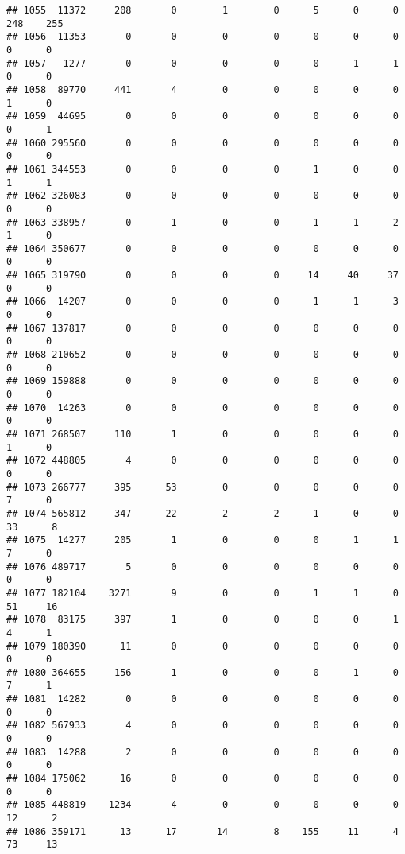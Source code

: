 \documentclass[
]{article}
\begin{document}
\begin{verbatim}
## 1055  11372     208       0        1        0      5      0      0   248    255
## 1056  11353       0       0        0        0      0      0      0     0      0
## 1057   1277       0       0        0        0      0      1      1     0      0
## 1058  89770     441       4        0        0      0      0      0     1      0
## 1059  44695       0       0        0        0      0      0      0     0      1
## 1060 295560       0       0        0        0      0      0      0     0      0
## 1061 344553       0       0        0        0      1      0      0     1      1
## 1062 326083       0       0        0        0      0      0      0     0      0
## 1063 338957       0       1        0        0      1      1      2     1      0
## 1064 350677       0       0        0        0      0      0      0     0      0
## 1065 319790       0       0        0        0     14     40     37     0      0
## 1066  14207       0       0        0        0      1      1      3     0      0
## 1067 137817       0       0        0        0      0      0      0     0      0
## 1068 210652       0       0        0        0      0      0      0     0      0
## 1069 159888       0       0        0        0      0      0      0     0      0
## 1070  14263       0       0        0        0      0      0      0     0      0
## 1071 268507     110       1        0        0      0      0      0     1      0
## 1072 448805       4       0        0        0      0      0      0     0      0
## 1073 266777     395      53        0        0      0      0      0     7      0
## 1074 565812     347      22        2        2      1      0      0    33      8
## 1075  14277     205       1        0        0      0      1      1     7      0
## 1076 489717       5       0        0        0      0      0      0     0      0
## 1077 182104    3271       9        0        0      1      1      0    51     16
## 1078  83175     397       1        0        0      0      0      1     4      1
## 1079 180390      11       0        0        0      0      0      0     0      0
## 1080 364655     156       1        0        0      0      1      0     7      1
## 1081  14282       0       0        0        0      0      0      0     0      0
## 1082 567933       4       0        0        0      0      0      0     0      0
## 1083  14288       2       0        0        0      0      0      0     0      0
## 1084 175062      16       0        0        0      0      0      0     0      0
## 1085 448819    1234       4        0        0      0      0      0    12      2
## 1086 359171      13      17       14        8    155     11      4    73     13

\end{verbatim}
\end{document}
